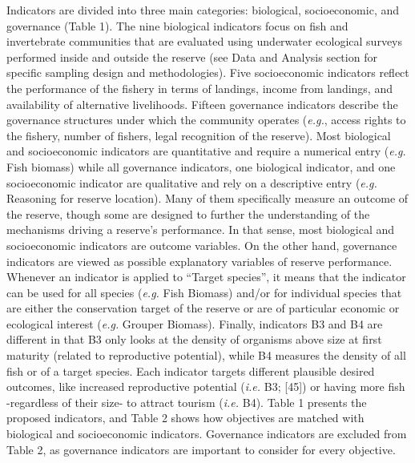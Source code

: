 \documentclass[12pt,]{article}
\begin{document}
Indicators are divided into three main categories: biological,
socioeconomic, and governance (Table 1). The nine biological indicators
focus on fish and invertebrate communities that are evaluated using
underwater ecological surveys performed inside and outside the reserve
(see Data and Analysis section for specific sampling design and
methodologies). Five socioeconomic indicators reflect the performance of
the fishery in terms of landings, income from landings, and availability
of alternative livelihoods. Fifteen governance indicators describe the
governance structures under which the community operates (\emph{e.g.},
access rights to the fishery, number of fishers, legal recognition of
the reserve). Most biological and socioeconomic indicators are
quantitative and require a numerical entry (\emph{e.g.} Fish biomass)
while all governance indicators, one biological indicator, and one
socioeconomic indicator are qualitative and rely on a descriptive entry
(\emph{e.g.} Reasoning for reserve location). Many of them specifically
measure an outcome of the reserve, though some are designed to further
the understanding of the mechanisms driving a reserve's performance. In
that sense, most biological and socioeconomic indicators are outcome
variables. On the other hand, governance indicators are viewed as
possible explanatory variables of reserve performance. Whenever an
indicator is applied to ``Target species'', it means that the indicator
can be used for all species (\emph{e.g.} Fish Biomass) and/or for
individual species that are either the conservation target of the
reserve or are of particular economic or ecological interest
(\emph{e.g.} Grouper Biomass). Finally, indicators B3 and B4 are
different in that B3 only looks at the density of organisms above size
at first maturity (related to reproductive potential), while B4 measures
the density of all fish or of a target species. Each indicator targets
different plausible desired outcomes, like increased reproductive
potential (\emph{i.e.} B3; {[}45{]}) or having more fish -regardless of
their size- to attract tourism (\emph{i.e.} B4). Table 1 presents the
proposed indicators, and Table 2 shows how objectives are matched with
biological and socioeconomic indicators. Governance indicators are
excluded from Table 2, as governance indicators are important to
consider for every objective.
\end{document}
